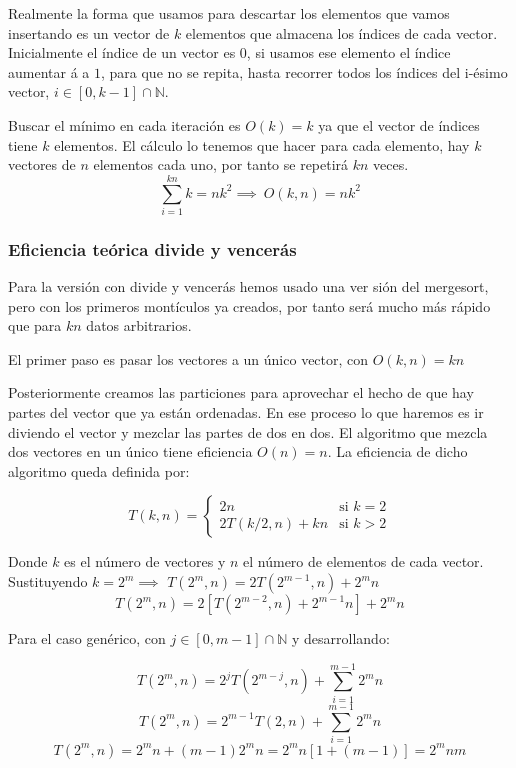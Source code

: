 Realmente la forma que usamos para descartar los elementos que vamos insertando es un vector de $k$ elementos que almacena los \'indices de cada vector. Inicialmente el \'indice de un vector es $0$, si usamos ese elemento el \'indice aumentar	\'a a $1$, para que no se repita, hasta recorrer todos los \'indices del i-\'esimo vector, $i \in [0,k-1]\cap \mathbb{N}$.

Buscar el m\'inimo en cada iteraci\'on es $O(k)=k$ ya que el vector de \'indices tiene $k$ elementos. El c\'alculo lo tenemos que hacer para cada elemento, hay $k$ vectores de $n$ elementos cada uno, por tanto se repetir\'a $kn$ veces.
\[\sum_{i=1}^{kn}k = nk^2 \implies \ O(k,n)=nk^2\]
		
\subsubsection{Eficiencia te\'orica divide y vencer\'as}
Para la versi\'on con divide y vencer\'as hemos usado una ver	si\'on del mergesort, pero con los primeros mont\'iculos ya creados, por tanto ser\'a mucho m\'as r\'apido que para $kn$ datos arbitrarios. 

El primer paso es pasar los vectores a un \'unico vector, con $O(k,n)=kn$

Posteriormente creamos las particiones para aprovechar el hecho de que hay partes del vector que ya est\'an ordenadas. En ese proceso lo que haremos es ir diviendo el vector y mezclar las partes de dos en dos. El algoritmo que mezcla dos vectores en un \'unico tiene eficiencia $O(n)=n$. La eficiencia de dicho algoritmo queda definida por:

\[T(k,n) = \left \{ 
\begin{matrix} 
		2n & 				\mbox{si } k=2
	\\ 2T(k/2,n) + kn & 		\mbox{si } k>2
\end{matrix}
\right.\]

Donde $k$ es el n\'umero de vectores y $n$ el n\'umero de elementos de cada vector.
Sustituyendo $k=2^m \implies$ $T(2^m, n) = 2T(2^{m-1}, n) + 2^mn$
\[T(2^m, n) = 2\left[ T(2^{m-2}, n) + 2^{m-1}n \right] + 2^mn\]
\begin{center}
	Para el caso gen\'erico, con $j \in \left[0,m-1\right] \cap\mathbb{N}$ y desarrollando:
\end{center}
\[T(2^m, n)	= 2^jT(2^{m-j}, n) + \sum_{i=1}^{m-1} 2^mn\]
\[T(2^m, n) = 2^{m-1} T(2, n) + \sum_{i=1}^{m-1} 2^mn\]
\[T(2^m, n) = 2^mn + (m-1) 2^mn = 2^mn[1+(m-1)] = 2^mnm\]

